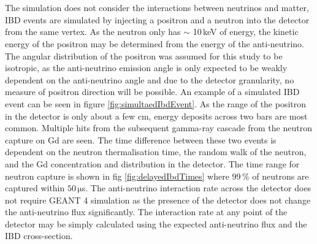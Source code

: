 \\\\The simulation does not consider the interactions between neutrinos and matter, IBD events are simulated by injecting a positron and a neutron into the detector from the same vertex. As the neutron only has $\sim$ 10\,keV of energy, the kinetic energy of the positron may be determined from the energy of the anti-neutrino. The angular distribution of the positron was assumed for this study to be isotropic, as the anti-neutrino emission angle is only expected to be weakly dependent on the anti-neutrino angle \cite{Vogel_1999} and due to the detector granularity, no measure of positron direction will be possible. An example of a simulated IBD event can be seen in figure \ref{fig:simultaedIbdEvent}. As the range of the positron in the detector is only about a few cm, energy deposits across two bars are most common. Multiple hits from the subsequent gamma-ray cascade from the neutron capture on Gd are seen. The time difference between these two events is dependent on the neutron thermalisation time, the random walk of the neutron, and the Gd concentration and distribution in the detector. The time range for neutron capture is shown in fig \ref{fig:delayedIbdTimes} where 99\,\% of neutrons are captured within $50\,\mathrm{\mu}$s. The anti-neutrino interaction rate across the detector does not require GEANT 4 simulation as the presence of the detector does not change the anti-neutrino flux significantly. The interaction rate at any point of the detector may be simply calculated using the expected anti-neutrino flux and the IBD cross-section.

